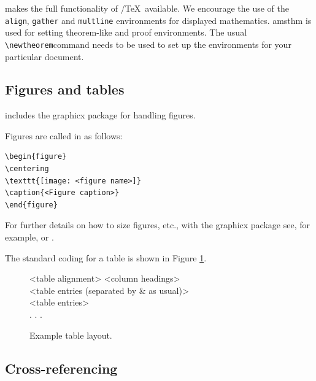 \documentclass[Afour,sageh,times]{includes/tex/sagej}
\begin{document}
\textsf{\journalclass} makes the full functionality of
\AmS/\TeX~available. We encourage the use of the \verb"align",
\verb"gather" and \verb"multline" environments for displayed
mathematics. \textsf{amsthm} is used for setting theorem-like and proof
environments. The usual \verb"\newtheorem"command needs to be used to
set up the environments for your particular document.

\subsection{Figures and tables}

\textsf{\journalclass} includes the \textsf{graphicx} package for
handling figures.

Figures are called in as follows:

\begin{verbatim}
\begin{figure}
\centering
\texttt{[image: <figure name>]}
\caption{<Figure caption>}
\end{figure}
\end{verbatim}

For further details on how to size figures, etc., with the
\textsf{graphicx} package see, for example, \cite{R1} or \cite{R3}.

The standard coding for a table is shown in Figure \ref{F2}.

\begin{figure}
  \setlength{\fboxsep}{0pt}%
  \setlength{\fboxrule}{0pt}%
  \begin{center}
  \begin{boxedverbatim}
  \begin{table}
  \small\sf\centering
  \caption{<Table caption.>}
  \begin{tabular}{<table alignment>}
  \toprule
  <column headings>\\
  \midrule
  <table entries
  (separated by & as usual)>\\
  <table entries>\\
  .
  .
  .\\
  \bottomrule
  \end{tabular}
  \end{table}
  \end{boxedverbatim}
  \end{center}
  \caption{Example table layout.\label{F2}}
\end{figure}

\subsection{Cross-referencing}
\end{document}
